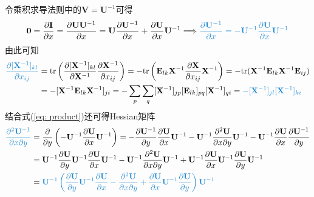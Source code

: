 \documentclass{ctexart}
\newcommand{\blue}[1]{\textcolor{Solarized-blue}{#1}}
\theoremstyle{definition}
\def \zerov {\bm{0}}
\def \Ev {\mathbf{E}}
\def \Iv {\mathbf{I}}
\def \Uv {\mathbf{U}}
\def \Vv {\mathbf{V}}
\def \Xv {\mathbf{X}}
\def \tr {\mathrm{tr}}
\begin{document}
令乘积求导法则中的$\Vv = \Uv^{-1}$可得
\begin{align} \label{eq: inverse}
    \zerov = \frac{\partial \Iv}{\partial x} = \frac{\partial \Uv \Uv^{-1}}{\partial x} = \Uv \frac{\partial \Uv^{-1}}{\partial x} + \frac{\partial \Uv}{\partial x} \Uv^{-1} \Longrightarrow \blue{\frac{\partial \Uv^{-1}}{\partial x} = - \Uv^{-1} \frac{\partial \Uv}{\partial x} \Uv^{-1}}
\end{align}
由此可知
\begin{align*}
    \blue{\frac{\partial [\Xv^{-1}]_{kl}}{\partial x_{ij}}} & = \tr \left( \frac{\partial [\Xv^{-1}]_{kl}}{\partial \Xv^{-1}} \frac{\partial \Xv^{-1}}{\partial x_{ij}} \right) = - \tr \left( \Ev_{lk} \Xv^{-1} \frac{\partial \Xv}{\partial x_{ij}} \Xv^{-1} \right) = - \tr ( \Xv^{-1} \Ev_{lk} \Xv^{-1} \Ev_{ij} ) \\
                                                            & = - [\Xv^{-1} \Ev_{lk} \Xv^{-1}]_{ji} = - \sum_p \sum_q [\Xv^{-1}]_{jp} [\Ev_{lk}]_{pq} [\Xv^{-1}]_{qi} = \blue{- [\Xv^{-1}]_{jl} [\Xv^{-1}]_{ki}}
\end{align*}
结合式(\ref{eq: product})还可得Hessian矩阵
\begin{align*}
    \blue{\frac{\partial^2 \Uv^{-1}}{\partial x \partial y}} & = \frac{\partial}{\partial y} \left( - \Uv^{-1} \frac{\partial \Uv}{\partial x} \Uv^{-1} \right) = - \frac{\partial \Uv^{-1}}{\partial y} \frac{\partial \Uv}{\partial x} \Uv^{-1} - \Uv^{-1} \frac{\partial^2 \Uv}{\partial x \partial y} \Uv^{-1} - \Uv^{-1} \frac{\partial \Uv}{\partial x} \frac{\partial \Uv^{-1}}{\partial y} \\
                                                             & = \Uv^{-1} \frac{\partial \Uv}{\partial y} \Uv^{-1} \frac{\partial \Uv}{\partial x} \Uv^{-1} - \Uv^{-1} \frac{\partial^2 \Uv}{\partial x \partial y} \Uv^{-1} + \Uv^{-1} \frac{\partial \Uv}{\partial x} \Uv^{-1} \frac{\partial \Uv}{\partial y} \Uv^{-1}                                                                          \\
                                                             & = \blue{\Uv^{-1} \left( \frac{\partial \Uv}{\partial y} \Uv^{-1} \frac{\partial \Uv}{\partial x} - \frac{\partial^2 \Uv}{\partial x \partial y} + \frac{\partial \Uv}{\partial x} \Uv^{-1} \frac{\partial \Uv}{\partial y} \right) \Uv^{-1}}
\end{align*}
\end{document}
